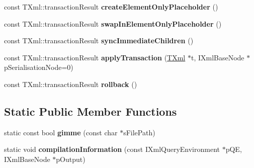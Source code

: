 \begin{DoxyCompactItemize}
\item 
\hypertarget{classgeneral__server_1_1Directory_a2fd1762b16b3a86a140599ac1668e62d}{const \-T\-Xml\-::transaction\-Result {\bfseries create\-Element\-Only\-Placeholder} ()}\label{classgeneral__server_1_1Directory_a2fd1762b16b3a86a140599ac1668e62d}

\item 
\hypertarget{classgeneral__server_1_1Directory_a1faafb78ae165dba44f149c410daa12e}{const \-T\-Xml\-::transaction\-Result {\bfseries swap\-In\-Element\-Only\-Placeholder} ()}\label{classgeneral__server_1_1Directory_a1faafb78ae165dba44f149c410daa12e}

\item 
\hypertarget{classgeneral__server_1_1Directory_adeccfbc0c702cddaf7489f67904f22a1}{const \-T\-Xml\-::transaction\-Result {\bfseries sync\-Immediate\-Children} ()}\label{classgeneral__server_1_1Directory_adeccfbc0c702cddaf7489f67904f22a1}

\item 
\hypertarget{classgeneral__server_1_1Directory_a64b5e37c828666190b791e58bbe0e8eb}{const \-T\-Xml\-::transaction\-Result {\bfseries apply\-Transaction} (\hyperlink{classgeneral__server_1_1TXml}{\-T\-Xml} $\ast$t, \-I\-Xml\-Base\-Node $\ast$p\-Serialisation\-Node=0)}\label{classgeneral__server_1_1Directory_a64b5e37c828666190b791e58bbe0e8eb}

\item 
\hypertarget{classgeneral__server_1_1Directory_ab4c94dd0cb30bff9ee83d2bb1112cece}{const \-T\-Xml\-::transaction\-Result {\bfseries rollback} ()}\label{classgeneral__server_1_1Directory_ab4c94dd0cb30bff9ee83d2bb1112cece}

\end{DoxyCompactItemize}
\subsection*{\-Static \-Public \-Member \-Functions}
\begin{DoxyCompactItemize}
\item 
\hypertarget{classgeneral__server_1_1Directory_a25d612ebc8cb4f070b95cc1961a48361}{static const bool {\bfseries gimme} (const char $\ast$s\-File\-Path)}\label{classgeneral__server_1_1Directory_a25d612ebc8cb4f070b95cc1961a48361}

\item 
\hypertarget{classgeneral__server_1_1Directory_afd6b847b916d0d6eadbd09ed2a3ae9d5}{static void {\bfseries compilation\-Information} (const \-I\-Xml\-Query\-Environment $\ast$p\-Q\-E, \-I\-Xml\-Base\-Node $\ast$p\-Output)}\label{classgeneral__server_1_1Directory_afd6b847b916d0d6eadbd09ed2a3ae9d5}

\end{DoxyCompactItemize}

